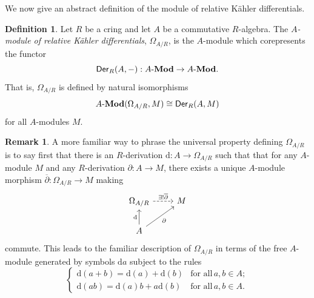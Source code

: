 \documentclass{amsart}
\theoremstyle{definition}
\newtheorem{remark}[equation]{Remark}
\newtheorem{definition}[equation]{Definition}
\DeclareMathOperator{\id}{id}
\newcommand{\Mod}[1]{{#1}\textnormal{-}\mathbf{Mod}}
\newcommand{\Kah}[2]{\Omega_{{#1}/{#2}}}
\numberwithin{equation}{subsection}
\begin{document}
%
We now give an abstract definition of the module of relative K{\"a}hler differentials.
\begin{definition}\label{Defn: Section Diff: Kahler Diffs}
	Let $R$ be a cring and let $A$ be a commutative $R$-algebra. The \emph{$A$-module of relative K{\"a}hler differentials}, $\Kah{A}{R}$, is the $A$-module which corepresents the functor
	\[
	\mathsf{Der}_R(A,-):\Mod{A} \to \Mod{A}.
	\]
	That is, $\Kah{A}{R}$ is defined by natural isomorphisms
	\[
	\Mod{A}(\Kah{A}{R},M) \cong \mathsf{Der}_R(A,M)
	\]
	for all $A$-modules $M$.
\end{definition}
\begin{remark}
	A more familiar way to phrase the universal property defining $\Kah{A}{R}$ is to say first that there is an $R$-derivation $\mathrm{d}:A \to \Kah{A}{R}$ such that that for any $A$-module $M$ and any $R$-derivation $\partial:A \to M$, there exists a unique $A$-module morphism $\overline{\partial}:\Kah{A}{R} \to M$ making
	\[
	\begin{tikzcd}
		\Kah{A}{R} \ar[r, dashed]{}{\exists!\overline{\partial}} & M \\
		A \ar[u]{}{\mathrm{d}} \ar[ur, swap]{}{\partial}
	\end{tikzcd}
	\]
	commute. This leads to the familiar description of $\Kah{A}{R}$ in terms of the free $A$-module generated by symbols $\mathrm{d}a$ subject to the rules
	\[
	\begin{cases}
		\mathrm{d}(a+b) = \mathrm{d}(a) + \mathrm{d}(b) & \text{for all}\, a, b \in A; \\
		\mathrm{d}(ab) = \mathrm{d}(a)b + a\mathrm{d}(b) & \text{for all}\, a,b \in A.
	\end{cases}
	\]
\end{remark}
\end{document}
